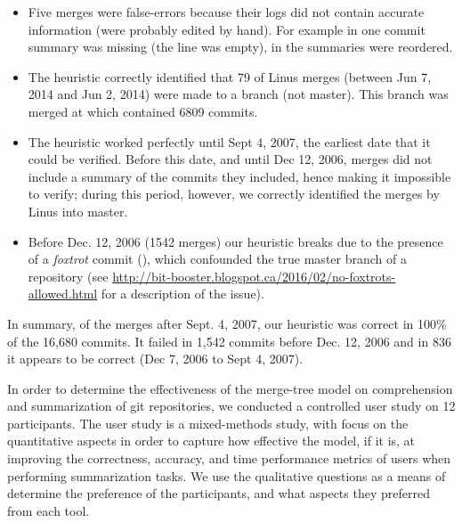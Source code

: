 \begin{itemize}

  \item

    Five merges were false-errors because their logs did not contain
    accurate information (were probably edited by hand). For example in
     one commit summary was missing (the line was
    empty), in  the summaries were reordered.

  \item

    The heuristic correctly identified that 79 of Linus merges (between
    Jun 7, 2014 and Jun 2, 2014) were made to a branch (not master).
    This branch was merged at  which contained 6809
    commits.

  \item

    The heuristic worked perfectly until Sept 4, 2007, the earliest date
    that it could be verified.  Before this date, and until Dec 12,
    2006, merges did not include a summary of the commits they included,
    hence making it impossible to verify; during this period, however,
    we correctly identified the merges by Linus into master.

  \item

    Before Dec. 12, 2006 (1542 merges) our heuristic breaks due to the
    presence of a \textit{foxtrot} commit (),
    which confounded the true master branch of a repository (see
    \url{http://bit-booster.blogspot.ca/2016/02/no-foxtrots-allowed.html}
    for a description of the issue).

\end{itemize}

In summary, of the merges after Sept. 4, 2007, our heuristic was correct
in 100\% of the 16,680 commits. It failed in 1,542 commits before Dec.
12, 2006 and in 836 it appears to be correct (Dec 7, 2006 to Sept 4,
2007).


In order to determine the effectiveness of the merge-tree model on
comprehension and summarization of git repositories, we conducted a
controlled user study on 12 participants. The user study is a
mixed-methods study, with focus on the quantitative aspects in order to
capture how effective the \mt model, if it is, at improving the
correctness, accuracy, and time performance metrics of users when
performing summarization tasks. We use the qualitative questions as a
means of determine the preference of the participants, and what aspects
they preferred from each tool.

